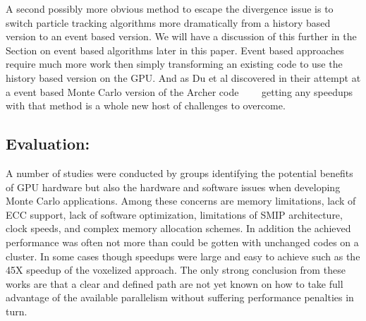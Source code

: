 A second possibly more obvious method to escape the divergence issue is to switch particle tracking algorithms more dramatically from a history based version to an event based version.
%
We will have a discussion of this further in the Section on event based algorithms later in this paper.
%
Event based approaches require much more work then simply transforming an existing code to use the history based version on the GPU.
%
And as Du et al discovered in their attempt at a event based Monte Carlo version of the Archer code~\cite{xu2015archer}~\cite{du2013evaluation}~\cite{liu2015comparison}~\cite{su2013monte}  getting any speedups with that method is a whole new host of challenges to overcome.

\subsection*{ Evaluation: }

A number of studies were conducted by groups identifying the potential benefits of GPU hardware but also the hardware and software issues when developing Monte Carlo applications.
%
Among these concerns are memory limitations, lack of ECC support, lack of software optimization, limitations of SMIP architecture, clock speeds, and complex memory allocation schemes.
%
In addition the achieved performance was often not more than could be gotten with unchanged codes on a cluster.
%
In some cases though speedups were large and easy to achieve such as the 45X speedup of the voxelized approach. 
%
The only strong conclusion from these works are that a clear and defined path are not yet known on how to take full advantage of the available parallelism without suffering performance penalties in turn. ~\cite{ding2011evaluation}

